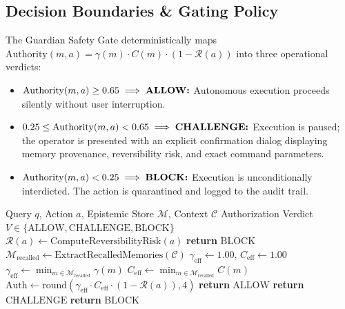 \documentclass[conference]{IEEEtran}
\providecommand{\RETURN}{\STATE \textbf{return} }
\begin{document}
\subsection{Decision Boundaries \& Gating Policy}
The Guardian Safety Gate deterministically maps $\text{Authority}(m, a) = \gamma(m) \cdot C(m) \cdot (1 - \mathcal{R}(a))$ into three operational verdicts:
\begin{itemize}
    \item $\text{Authority}(m, a) \geq 0.65 \implies \text{\textbf{ALLOW:}}$ Autonomous execution proceeds silently without user interruption.
    \item $0.25 \leq \text{Authority}(m, a) < 0.65 \implies \text{\textbf{CHALLENGE:}}$ Execution is paused; the operator is presented with an explicit confirmation dialog displaying memory provenance, reversibility risk, and exact command parameters.
    \item $\text{Authority}(m, a) < 0.25 \implies \text{\textbf{BLOCK:}}$ Execution is unconditionally interdicted. The action is quarantined and logged to the audit trail.
\end{itemize}

\begin{algorithm}[t]
\caption{MemoryQuarantine Dual-Plane Tool Authorization}
\label{algo:quarantine}
\begin{algorithmic}[1]
\REQUIRE Query $q$, Action $a$, Epistemic Store $\mathcal{M}$, Context $\mathcal{C}$
\ENSURE Authorization Verdict $V \in \{\text{ALLOW}, \text{CHALLENGE}, \text{BLOCK}\}$
\STATE $\mathcal{R}(a) \leftarrow \text{ComputeReversibilityRisk}(a)$
    \RETURN $\text{BLOCK}$ 
\ENDIF
\STATE $\mathcal{M}_{\text{recalled}} \leftarrow \text{ExtractRecalledMemories}(\mathcal{C})$
    \STATE $\gamma_{\text{eff}} \leftarrow 1.00$, $C_{\text{eff}} \leftarrow 1.00$ 
\ELSE
    \STATE $\gamma_{\text{eff}} \leftarrow \min_{m \in \mathcal{M}_{\text{recalled}}} \gamma(m)$ 
    \STATE $C_{\text{eff}} \leftarrow \min_{m \in \mathcal{M}_{\text{recalled}}} C(m)$
\ENDIF
\STATE $\text{Auth} \leftarrow \text{round}(\gamma_{\text{eff}} \cdot C_{\text{eff}} \cdot (1 - \mathcal{R}(a)), 4)$
    \RETURN $\text{ALLOW}$
    \RETURN $\text{CHALLENGE}$
\ELSE
    \RETURN $\text{BLOCK}$
\ENDIF
\end{algorithmic}
\end{algorithm}
\end{document}

